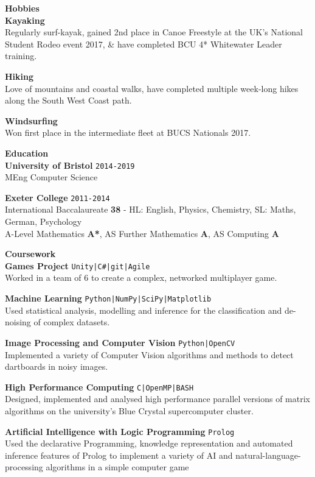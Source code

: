 \documentclass[10pt]{article}
\newcommand{\sect}[1]{{\LARGE{\textbf{#1}}}\vspace{0.1em}\\}
\newcommand{\xx}[2]{{\large\textbf{#1}}\\{#2}\vspace{0.5em}}
\newcommand{\zz}[3]{{\large\textbf{#1}} \hfill {\small \colorbox{boxcol}{\texttt{#3}} }\\{#2}\vspace{0.5em}}
\newcommand{\li}{\textcolor{linecol}{|}}
\begin{document}
\begin{minipage}[t]{0.33\textwidth}
\sect{Hobbies}

\xx{Kayaking}
{Regularly surf-kayak, gained 2nd place in Canoe Freestyle at the UK's National Student Rodeo event 2017, \& have completed BCU 4* Whitewater Leader training.
}

\xx{Hiking}
{Love of mountains and coastal walks, have completed multiple week-long hikes along the South West Coast path.}

\xx{Windsurfing}
{Won first place in the intermediate fleet at BUCS Nationals 2017.}






\end{minipage} 
\hfill
\begin{minipage}[t]{0.66\textwidth}
%
%
\sect{Education}
\zz{University of Bristol}{MEng Computer Science}{2014-2019}

\zz{Exeter College}{International Baccalaureate \textbf{38} {\scriptsize - HL: English, Physics, Chemistry, SL: Maths, German, Psychology}\\
A-Level Mathematics \textbf{A*}, 
AS Further Mathematics \textbf{A}, AS Computing \textbf{A}}{2011-2014}






\vfill




\raggedright
\sect{Coursework}
\zz{Games Project}
{Worked in a team of 6 to create a complex, networked multiplayer game.}{Unity\li C\#\li git\li Agile}

\zz{Machine Learning}
{Used statistical analysis, modelling and inference for the classification and de-noising of complex datasets.}{Python\li NumPy\li SciPy\li Matplotlib}

\zz{Image Processing and Computer Vision}
{Implemented a variety of Computer Vision algorithms and methods to detect dartboards in noisy images.}{Python\li OpenCV}

\zz{High Performance Computing}
{Designed, implemented and analysed high performance parallel versions of matrix algorithms on the university’s Blue Crystal supercomputer cluster.}{C\li OpenMP\li BASH}

\zz{Artificial Intelligence with Logic Programming}
{Used the declarative Programming, knowledge representation and automated inference features of Prolog to implement a variety of AI and natural-language-processing algorithms in a simple computer game}{Prolog}


\end{minipage}
\end{document}
